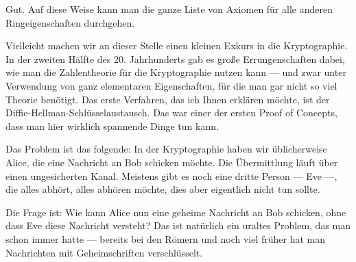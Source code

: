 \begin{spoken-clean}[00:13:25 - 00:15:10]
Gut. Auf diese Weise kann man die ganze Liste von Axiomen für alle anderen Ringeigenschaften durchgehen.

Vielleicht machen wir an dieser Stelle einen kleinen Exkurs in die Kryptographie. In der zweiten Hälfte des 20. Jahrhunderts gab es große Errungenschaften dabei, wie man die Zahlentheorie für die Kryptographie nutzen kann --- und zwar unter Verwendung von ganz elementaren Eigenschaften, für die man gar nicht so viel Theorie benötigt. Das erste Verfahren, das ich Ihnen erklären möchte, ist der Diffie-Hellman-Schlüsselaustausch. Das war einer der ersten Proof of Concepts, dass man hier wirklich spannende Dinge tun kann.

Das Problem ist das folgende: In der Kryptographie haben wir üblicherweise Alice, die eine Nachricht an Bob schicken möchte. Die Übermittlung läuft über einen ungesicherten Kanal. Meistens gibt es noch eine dritte Person --- Eve ---, die alles abhört, alles abhören möchte, dies aber eigentlich nicht tun sollte.

Die Frage ist: Wie kann Alice nun eine geheime Nachricht an Bob schicken, ohne dass Eve diese Nachricht versteht? Das ist natürlich ein uraltes Problem, das man schon immer hatte --- bereits bei den Römern und noch viel früher hat man Nachrichten mit Geheimschriften verschlüsselt.
\end{spoken-clean}

\begin{math-stroke}
\begin{center}
\end{center}
\end{math-stroke}

